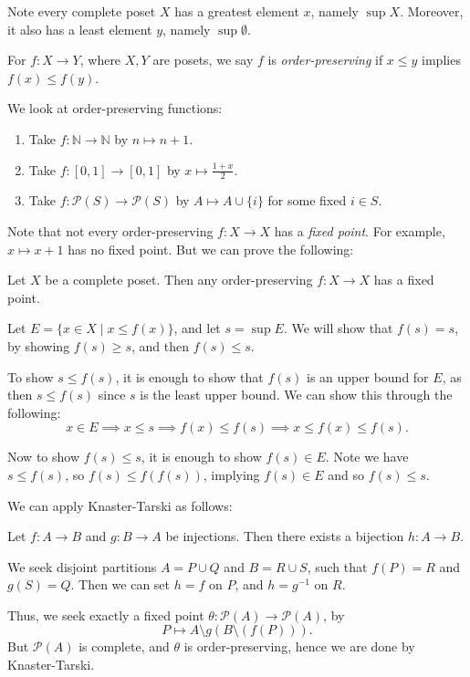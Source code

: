 \documentclass[12pt]{article}
\begin{document}
Note every complete poset $X$ has a greatest element $x$, namely $\sup X$. Moreover, it also has a least element $y$, namely $\sup \emptyset$.

For $f : X \to Y$, where $X, Y$ are posets, we say $f$ is \emph{order-preserving} if $x \leq y$ implies $f(x) \leq f(y)$.
\begin{exbox}
	We look at order-preserving functions:
	\begin{enumerate}
		\item Take $f : \mathbb{N} \to \mathbb{N}$ by $n \mapsto n + 1$.
		\item Take $f : [0,1] \to [0,1]$ by $x \mapsto \frac{1+x}{2}$.
		\item Take $f : \mathcal{P}(S) \to \mathcal{P}(S)$ by $A \mapsto A \cup \{i\}$ for some fixed $i \in S$.
	\end{enumerate}
\end{exbox}

Note that not every order-preserving $f : X \to X$ has a \emph{fixed point}. For example, $x \mapsto x+1$ has no fixed point. But we can prove the following:
\begin{theorem}
	Let $X$ be a complete poset. Then any order-preserving $f : X \to X$ has a fixed point.
\end{theorem}

\begin{proofbox}
	Let $E = \{x \in X \mid x \leq f(x)\}$, and let $s = \sup E$. We will show that $f(s) = s$, by showing $f(s) \geq s$, and then $f(s) \leq s$.

	To show $s \leq f(s)$, it is enough to show that $f(s)$ is an upper bound for $E$, as then $s \leq f(s)$ since $s$ is the least upper bound. We can show this through the following:
	\[
	x \in E \implies x \leq s \implies f(x) \leq f(s) \implies x \leq f(x) \leq f(s)
	.\]

	Now to show $f(s) \leq s$, it is enough to show $f(s) \in E$. Note we have $s \leq f(s)$, so $f(s) \leq f(f(s))$, implying $f(s) \in E$ and so $f(s) \leq s$.
\end{proofbox}

We can apply Knaster-Tarski as follows:
\begin{corollary}
	Let $f : A \to B$ and $g : B \to A$ be injections. Then there exists a bijection $h : A \to B$.
\end{corollary}

\begin{proofbox}
	We seek disjoint partitions $A = P \cup Q$ and $B = R \cup S$, such that $f(P) = R$ and $g(S) = Q$. Then we can set $h = f$ on $P$, and $h = g^{-1}$ on $R$.

	Thus, we seek exactly a fixed point $\theta : \mathcal{P}(A) \to \mathcal{P}(A)$, by
	\[
	P \mapsto A \setminus g(B \setminus(f(P)))
	.\]
	But $\mathcal{P}(A)$ is complete, and $\theta$ is order-preserving, hence we are done by Knaster-Tarski.
\end{proofbox}
\end{document}
